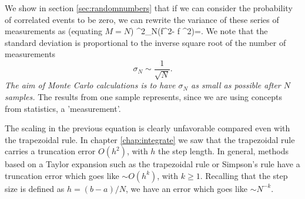 We show in section \ref{sec:randomnumbers} that if we can consider the probability of 
correlated events to be zero, we can rewrite
the variance of these series of measurements as (equating $M=N$) 
\be
  \sigma^2_N\approx {}\left(\langle f^2\rangle - 
                                 \langle f \rangle^2\right)=.
\label{eq:sigmaN}
\ee
We note that the standard deviation is proportional to the inverse square root of 
the number of measurements 
\[
   \sigma_N \sim \frac{1}{\sqrt{N}}.
\]
{\em The aim of Monte Carlo calculations is to have $\sigma_N$ as small as possible after $N$ samples. }
The results from one  sample represents, 
since we are using concepts from statistics,
a 'measurement'. 

The scaling in the previous equation 
is clearly unfavorable compared even with the 
trapezoidal rule. In chapter \ref{chap:integrate} we saw that the trapezoidal
rule carries a truncation error $O(h^2)$, with $h$ the step length.
In general, methods based on a Taylor expansion such as the trapezoidal
rule or Simpson's rule have a truncation
error which goes like $\sim O(h^k)$, with $k \ge 1$. 
Recalling that the step size is defined as $h=(b-a)/N$, we have an
error which goes like $\sim N^{-k}$.  

